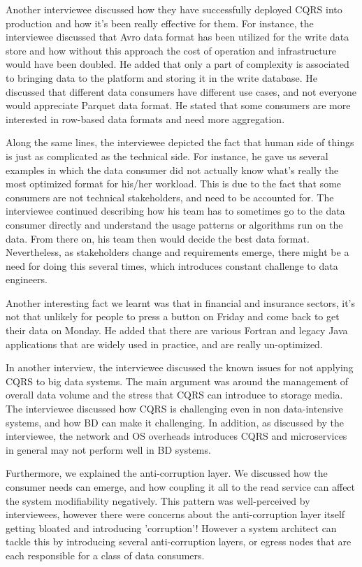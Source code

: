 \documentclass{bmcart}
\begin{document}
Another interviewee discussed how they have successfully deployed CQRS into production and how it's been really effective for them. For instance, the interviewee discussed that Avro data format has been utilized for the write data store and how without this approach the cost of operation and infrastructure would have been doubled. He added that only a part of complexity is associated to bringing data to the platform and storing it in the write database. He discussed that different data consumers have different use cases, and not everyone would appreciate Parquet data format. He stated that some consumers are more interested in row-based data formats and need more aggregation. 

Along the same lines, the interviewee depicted the fact that human side of things is just as complicated as the technical side. For instance, he gave us several examples in which the data consumer did not actually know what's really the most optimized format for his/her workload. This is due to the fact that some consumers are not technical stakeholders, and need to be accounted for. The interviewee continued describing how his team has to sometimes go to the data consumer directly and understand the usage patterns or algorithms run on the data. From there on, his team then would decide the best data format. Nevertheless, as stakeholders change and requirements emerge, there might be a need for doing this several times, which introduces constant challenge to data engineers.

Another interesting fact we learnt was that in financial and insurance sectors, it's not that unlikely for people to press a button on Friday and come back to get their data on Monday. He added that there are various Fortran and legacy Java applications that are widely used in practice, and are really un-optimized.


In another interview, the interviewee discussed the known issues for not applying CQRS to big data systems. The main argument was around the management of overall data volume and the stress that CQRS can introduce to storage media. The interviewee discussed how CQRS is challenging even in non data-intensive systems, and how BD can make it challenging. In addition, as discussed by the interviewee, the network and OS overheads introduces CQRS and microservices in general \cite{sriraman2018mu} may not perform well in BD systems.

Furthermore, we explained the anti-corruption layer. We discussed how the consumer needs can emerge, and how coupling it all to the read service can affect the system modifiability negatively. This pattern was well-perceived by interviewees, however there were concerns about the anti-corruption layer itself getting bloated and introducing 'corruption'! However a system architect can tackle this by introducing several anti-corruption layers, or egress nodes that are each responsible for a class of data consumers. 
\end{document}
